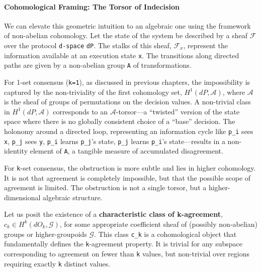 \documentclass[
]{article}
\begin{document}
\paragraph{Cohomological Framing: The Torsor of
Indecision}\label{cohomological-framing-the-torsor-of-indecision}

We can elevate this geometric intuition to an algebraic one using the
framework of non-abelian cohomology. Let the state of the system be
described by a sheaf \(\mathcal{F}\) over the protocol \texttt{d-space}
\texttt{dP}. The stalks of this sheaf, \(\mathcal{F}_x\), represent the
information available at an execution state \texttt{x}. The transitions
along directed paths are given by a non-abelian group \texttt{A} of
transformations.

For 1-set consensus (\texttt{k=1}), as discussed in previous chapters,
the impossibility is captured by the non-triviality of the first
cohomology set, \(H^1(dP, \mathcal{A})\), where \(\mathcal{A}\) is the
sheaf of groups of permutations on the decision values. A non-trivial
class in \(H^1(dP, \mathcal{A})\) corresponds to an
\(\mathcal{A}\)-torsor---a ``twisted'' version of the state space where
there is no globally consistent choice of a ``base'' decision. The
holonomy around a directed loop, representing an information cycle like
\texttt{p\_i} sees \texttt{x}, \texttt{p\_j} sees \texttt{y},
\texttt{p\_i} learns \texttt{p\_j}'s state, \texttt{p\_j} learns
\texttt{p\_i}'s state---results in a non-identity element of \texttt{A},
a tangible measure of accumulated disagreement.

For \texttt{k}-set consensus, the obstruction is more subtle and lies in
higher cohomology. It is not that agreement is completely impossible,
but that the possible scope of agreement is limited. The obstruction is
not a single torsor, but a higher-dimensional algebraic structure.

Let us posit the existence of a \textbf{characteristic class of
k-agreement}, \(c_k \in H^k(dO_k, \mathcal{G})\), for some appropriate
coefficient sheaf of (possibly non-abelian) groups or higher-groupoids
\(\mathcal{G}\). This class \texttt{c\_k} is a cohomological object that
fundamentally defines the \texttt{k}-agreement property. It is trivial
for any subspace corresponding to agreement on fewer than \texttt{k}
values, but non-trivial over regions requiring exactly \texttt{k}
distinct values.
\end{document}
